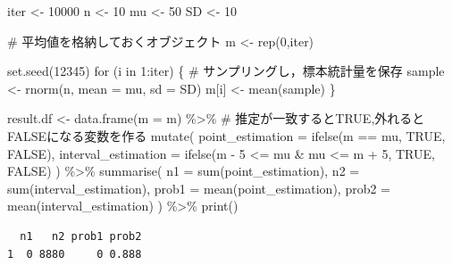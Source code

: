 \documentclass[
  a4paper,
]{ltjsbook}
\newenvironment{Shaded}{\begin{snugshade}}{\end{snugshade}}
\newcommand{\AttributeTok}[1]{\textcolor[rgb]{0.40,0.45,0.13}{#1}}
\newcommand{\CommentTok}[1]{\textcolor[rgb]{0.37,0.37,0.37}{#1}}
\newcommand{\ConstantTok}[1]{\textcolor[rgb]{0.56,0.35,0.01}{#1}}
\newcommand{\ControlFlowTok}[1]{\textcolor[rgb]{0.00,0.23,0.31}{#1}}
\newcommand{\DecValTok}[1]{\textcolor[rgb]{0.68,0.00,0.00}{#1}}
\newcommand{\FunctionTok}[1]{\textcolor[rgb]{0.28,0.35,0.67}{#1}}
\newcommand{\NormalTok}[1]{\textcolor[rgb]{0.00,0.23,0.31}{#1}}
\newcommand{\OtherTok}[1]{\textcolor[rgb]{0.00,0.23,0.31}{#1}}
\newcommand{\SpecialCharTok}[1]{\textcolor[rgb]{0.37,0.37,0.37}{#1}}
\begin{document}
\begin{Shaded}
\begin{Highlighting}[]
\NormalTok{iter }\OtherTok{\textless{}{-}} \DecValTok{10000}
\NormalTok{n }\OtherTok{\textless{}{-}} \DecValTok{10}
\NormalTok{mu }\OtherTok{\textless{}{-}} \DecValTok{50}
\NormalTok{SD }\OtherTok{\textless{}{-}} \DecValTok{10}

\CommentTok{\# 平均値を格納しておくオブジェクト}
\NormalTok{m }\OtherTok{\textless{}{-}} \FunctionTok{rep}\NormalTok{(}\DecValTok{0}\NormalTok{,iter)}

\FunctionTok{set.seed}\NormalTok{(}\DecValTok{12345}\NormalTok{)}
\ControlFlowTok{for}\NormalTok{ (i }\ControlFlowTok{in} \DecValTok{1}\SpecialCharTok{:}\NormalTok{iter) \{}
  \CommentTok{\# サンプリングし，標本統計量を保存}
\NormalTok{  sample }\OtherTok{\textless{}{-}} \FunctionTok{rnorm}\NormalTok{(n, }\AttributeTok{mean =}\NormalTok{ mu, }\AttributeTok{sd =}\NormalTok{ SD)}
\NormalTok{  m[i] }\OtherTok{\textless{}{-}} \FunctionTok{mean}\NormalTok{(sample)}
\NormalTok{\}}

\NormalTok{result.df }\OtherTok{\textless{}{-}} \FunctionTok{data.frame}\NormalTok{(}\AttributeTok{m =}\NormalTok{ m) }\SpecialCharTok{\%\textgreater{}\%}
  \CommentTok{\# 推定が一致するとTRUE,外れるとFALSEになる変数を作る}
  \FunctionTok{mutate}\NormalTok{(}
    \AttributeTok{point\_estimation =} \FunctionTok{ifelse}\NormalTok{(m }\SpecialCharTok{==}\NormalTok{ mu, }\ConstantTok{TRUE}\NormalTok{, }\ConstantTok{FALSE}\NormalTok{),}
    \AttributeTok{interval\_estimation =} \FunctionTok{ifelse}\NormalTok{(m }\SpecialCharTok{{-}} \DecValTok{5} \SpecialCharTok{\textless{}=}\NormalTok{ mu }\SpecialCharTok{\&}\NormalTok{ mu }\SpecialCharTok{\textless{}=}\NormalTok{ m }\SpecialCharTok{+} \DecValTok{5}\NormalTok{, }\ConstantTok{TRUE}\NormalTok{, }\ConstantTok{FALSE}\NormalTok{)}
\NormalTok{  ) }\SpecialCharTok{\%\textgreater{}\%} 
  \FunctionTok{summarise}\NormalTok{(}
    \AttributeTok{n1 =} \FunctionTok{sum}\NormalTok{(point\_estimation),}
    \AttributeTok{n2 =} \FunctionTok{sum}\NormalTok{(interval\_estimation),}
    \AttributeTok{prob1 =} \FunctionTok{mean}\NormalTok{(point\_estimation),}
    \AttributeTok{prob2 =} \FunctionTok{mean}\NormalTok{(interval\_estimation)}
\NormalTok{  ) }\SpecialCharTok{\%\textgreater{}\%} \FunctionTok{print}\NormalTok{()}
\end{Highlighting}
\end{Shaded}

\begin{verbatim}
  n1   n2 prob1 prob2
1  0 8880     0 0.888
\end{verbatim}
\end{document}

